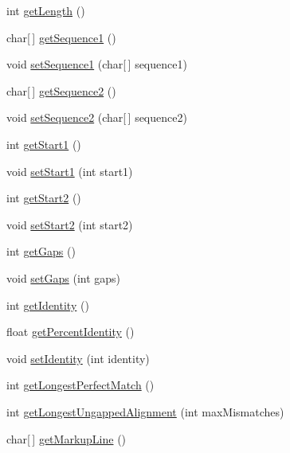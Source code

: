 \begin{DoxyCompactItemize}
\item 
int \hyperlink{classjaligner_1_1_alignment_a7258f6e5bf636f0ac59767f42f1c3d9d}{get\+Length} ()
\item 
char\mbox{[}$\,$\mbox{]} \hyperlink{classjaligner_1_1_alignment_a846af4ea8699097936db4fc7282ea727}{get\+Sequence1} ()
\item 
void \hyperlink{classjaligner_1_1_alignment_ab4d4eeae40a289f641011f699e3e359c}{set\+Sequence1} (char\mbox{[}$\,$\mbox{]} sequence1)
\item 
char\mbox{[}$\,$\mbox{]} \hyperlink{classjaligner_1_1_alignment_af4b53d82f275712ec1b8e090f04a27f2}{get\+Sequence2} ()
\item 
void \hyperlink{classjaligner_1_1_alignment_a0c3ae8867af22b16c950984b0ebdb463}{set\+Sequence2} (char\mbox{[}$\,$\mbox{]} sequence2)
\item 
int \hyperlink{classjaligner_1_1_alignment_acea04b1b3442fbbe9e18c1700dc97757}{get\+Start1} ()
\item 
void \hyperlink{classjaligner_1_1_alignment_a234e5b4ef8032cbefcd96413706aa293}{set\+Start1} (int start1)
\item 
int \hyperlink{classjaligner_1_1_alignment_a74e0e6fb22bf32202ef16001ce2ba9e8}{get\+Start2} ()
\item 
void \hyperlink{classjaligner_1_1_alignment_a3fbb3c1b258dd460fd7f486c2ef1384e}{set\+Start2} (int start2)
\item 
int \hyperlink{classjaligner_1_1_alignment_af51939568ee574d67afd7f6e7b6efe96}{get\+Gaps} ()
\item 
void \hyperlink{classjaligner_1_1_alignment_a86b472121858e6f1f5f5d53e6516cb66}{set\+Gaps} (int gaps)
\item 
int \hyperlink{classjaligner_1_1_alignment_a5b3b8597278c2e880627aa51b366742f}{get\+Identity} ()
\item 
float \hyperlink{classjaligner_1_1_alignment_a14c3147b9f914f86e93eba1a7ccb86f1}{get\+Percent\+Identity} ()
\item 
void \hyperlink{classjaligner_1_1_alignment_af64b2e17cdbf370af3ab167fc0fc7c53}{set\+Identity} (int identity)
\item 
int \hyperlink{classjaligner_1_1_alignment_a200ad943e56a07cbc196fed4844a4f0b}{get\+Longest\+Perfect\+Match} ()
\item 
int \hyperlink{classjaligner_1_1_alignment_ab441a0192a6807aea435daf33c38ad7a}{get\+Longest\+Ungapped\+Alignment} (int max\+Mismatches)
\item 
char\mbox{[}$\,$\mbox{]} \hyperlink{classjaligner_1_1_alignment_a6915c636c16199e545f3aa04402d7f8c}{get\+Markup\+Line} ()

\end{DoxyCompactItemize}

